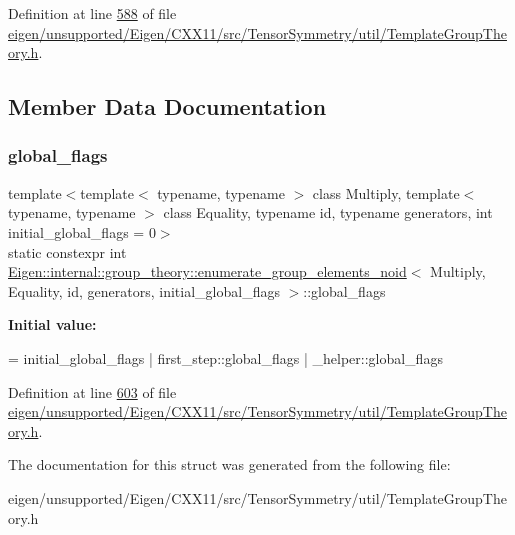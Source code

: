 Definition at line \hyperlink{eigen_2unsupported_2_eigen_2_c_x_x11_2src_2_tensor_symmetry_2util_2_template_group_theory_8h_source_l00588}{588} of file \hyperlink{eigen_2unsupported_2_eigen_2_c_x_x11_2src_2_tensor_symmetry_2util_2_template_group_theory_8h_source}{eigen/unsupported/\+Eigen/\+C\+X\+X11/src/\+Tensor\+Symmetry/util/\+Template\+Group\+Theory.\+h}.



\subsection{Member Data Documentation}
\mbox{\label{struct_eigen_1_1internal_1_1group__theory_1_1enumerate__group__elements__noid_afd51b07ee7d2341eb8ff5fd65c285988}} 
\subsubsection{\texorpdfstring{global\+\_\+flags}{global\_flags}}
{\footnotesize\ttfamily template$<$template$<$ typename, typename $>$ class Multiply, template$<$ typename, typename $>$ class Equality, typename id, typename generators, int initial\+\_\+global\+\_\+flags = 0$>$ \\
static constexpr int \hyperlink{struct_eigen_1_1internal_1_1group__theory_1_1enumerate__group__elements__noid}{Eigen\+::internal\+::group\+\_\+theory\+::enumerate\+\_\+group\+\_\+elements\+\_\+noid}$<$ Multiply, Equality, id, generators, initial\+\_\+global\+\_\+flags $>$\+::global\+\_\+flags\hspace{0.3cm}{\ttfamily [static]}}

{\bfseries Initial value\+:}
\begin{DoxyCode}
=
    initial\_global\_flags |
    first\_step::global\_flags |
    \_helper::global\_flags
\end{DoxyCode}


Definition at line \hyperlink{eigen_2unsupported_2_eigen_2_c_x_x11_2src_2_tensor_symmetry_2util_2_template_group_theory_8h_source_l00603}{603} of file \hyperlink{eigen_2unsupported_2_eigen_2_c_x_x11_2src_2_tensor_symmetry_2util_2_template_group_theory_8h_source}{eigen/unsupported/\+Eigen/\+C\+X\+X11/src/\+Tensor\+Symmetry/util/\+Template\+Group\+Theory.\+h}.



The documentation for this struct was generated from the following file\+:\begin{DoxyCompactItemize}
\item 
eigen/unsupported/\+Eigen/\+C\+X\+X11/src/\+Tensor\+Symmetry/util/\+Template\+Group\+Theory.\+h\end{DoxyCompactItemize}
